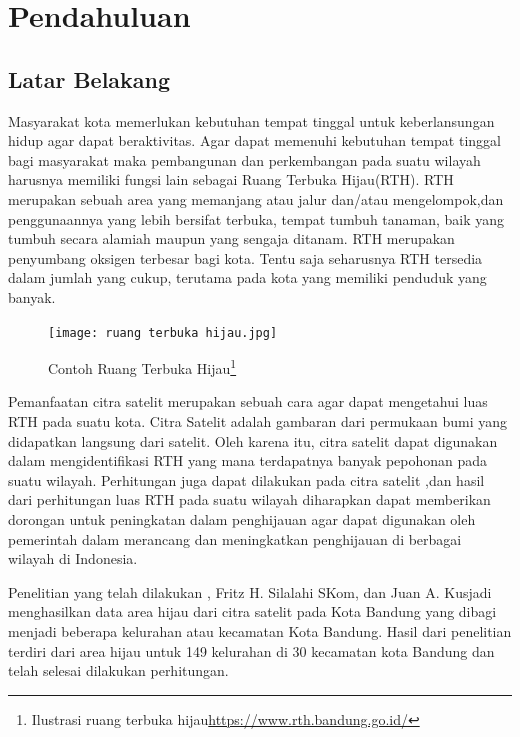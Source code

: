\chapter{Pendahuluan}
\label{chap:intro}

\section{Latar Belakang}
\label{sec:label}

Masyarakat kota memerlukan kebutuhan tempat tinggal untuk keberlansungan hidup agar dapat beraktivitas. Agar dapat memenuhi kebutuhan tempat tinggal bagi masyarakat maka pembangunan dan perkembangan pada suatu wilayah harusnya memiliki fungsi lain sebagai Ruang Terbuka Hijau(RTH). RTH merupakan sebuah area yang memanjang atau jalur dan/atau mengelompok,dan penggunaannya yang lebih bersifat terbuka, tempat tumbuh tanaman, baik yang tumbuh secara alamiah maupun yang sengaja ditanam. RTH merupakan penyumbang oksigen terbesar bagi kota. Tentu saja seharusnya RTH tersedia dalam jumlah yang cukup, terutama pada kota yang memiliki penduduk yang banyak.

\begin{figure}[h]
	\centering
	\texttt{[image: ruang terbuka hijau.jpg]}
	\caption[RTH]{Contoh Ruang Terbuka Hijau\footnote{Ilustrasi ruang terbuka hijau\url{https://www.rth.bandung.go.id/}}}
	
\end{figure}


Pemanfaatan citra satelit merupakan sebuah cara agar dapat mengetahui luas RTH pada suatu kota. Citra Satelit adalah gambaran dari permukaan bumi yang didapatkan langsung dari satelit. Oleh karena itu, citra satelit dapat digunakan dalam mengidentifikasi RTH yang mana terdapatnya banyak pepohonan pada suatu wilayah. Perhitungan juga dapat dilakukan pada citra satelit ,dan hasil dari perhitungan luas RTH pada suatu wilayah diharapkan dapat memberikan dorongan untuk peningkatan dalam penghijauan agar dapat digunakan oleh pemerintah dalam merancang dan meningkatkan penghijauan di berbagai wilayah di Indonesia.


Penelitian yang telah dilakukan \VSM, Fritz H. Silalahi SKom, dan Juan A. Kusjadi menghasilkan data area hijau dari citra satelit pada Kota Bandung yang dibagi menjadi beberapa kelurahan atau kecamatan Kota Bandung. Hasil dari penelitian terdiri dari area hijau untuk 149 kelurahan di 30 kecamatan kota Bandung dan telah selesai dilakukan perhitungan.

